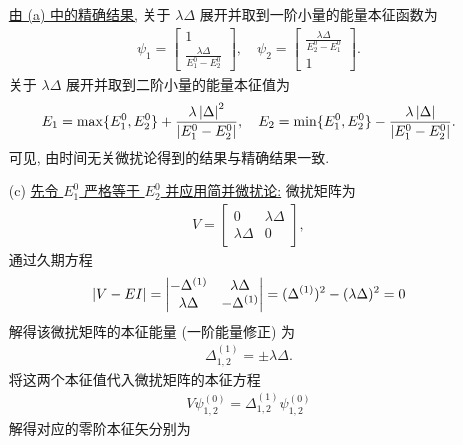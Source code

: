 \documentclass{assignment}
\begin{document}
\begin{sol}
\begin{itemize}
        \uline{由 (a) 中的精确结果,} 关于 $\lambda\Delta$ 展开并取到一阶小量的能量本征函数为
        \begin{align}
            \psi_1=\begin{bmatrix}
                1\\
                \frac{\lambda\Delta}{E_1^0-E_2^0}
            \end{bmatrix},\quad\psi_2=\begin{bmatrix}
                \frac{\lambda\Delta}{E_2^0-E_1^0}\\
                1
            \end{bmatrix}.
        \end{align}
        关于 $\lambda\Delta$ 展开并取到二阶小量的能量本征值为
        \begin{align}
            E_1=\max\{E_1^0,E_2^0\}+\frac{\lambda\left\lvert\Delta\right\rvert^2}{\left\lvert E_1^0-E_2^0\right\rvert},\quad E_2=\min\{E_1^0,E_2^0\}-\frac{\lambda\left\lvert\Delta\right\rvert}{\left\lvert E_1^0-E_2^0\right\rvert}.
        \end{align}
        可见, 由时间无关微扰论得到的结果与精确结果一致.
        \item[(c)] \uline{先令 $E_1^0$ 严格等于 $E_2^0$ 并应用简并微扰论:} 微扰矩阵为
        \begin{align}
            V=\begin{bmatrix}
                0&\lambda\Delta\\
                \lambda\Delta&0
            \end{bmatrix},
        \end{align}
        通过久期方程
        \begin{align}
            \left\lvert V-EI\right\rvert=\begin{vmatrix}
                -\Delta^{(1)}&\lambda\Delta\\
                \lambda\Delta&-\Delta^{(1)}
            \end{vmatrix}=(\Delta^{(1)})^2-(\lambda\Delta)^2=0
        \end{align}
        解得该微扰矩阵的本征能量 (一阶能量修正) 为
        \begin{align}
            \Delta_{1,2}^{(1)}=\pm\lambda\Delta.
        \end{align}
        将这两个本征值代入微扰矩阵的本征方程
        \begin{align}
            V\psi_{1,2}^{(0)}=\Delta_{1,2}^{(1)}\psi_{1,2}^{(0)}
        \end{align}
        解得对应的零阶本征矢分别为
        \begin{align}

\end{align}
\end{itemize}
\end{sol}
\end{document}
